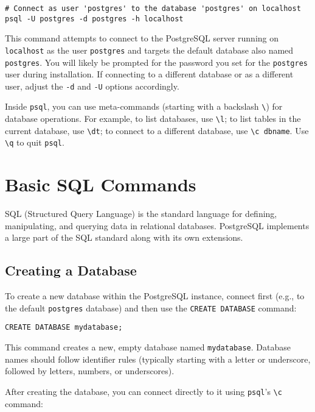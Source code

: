 \documentclass[12pt]{book}
\begin{document}
\begin{lstlisting}[style=bashstyle, caption={Connecting via psql}, label=lst:psql_connect]
# Connect as user 'postgres' to the database 'postgres' on localhost
psql -U postgres -d postgres -h localhost
\end{lstlisting}

This command attempts to connect to the PostgreSQL server running on \texttt{localhost} as the user \texttt{postgres} and targets the default database also named \texttt{postgres}. You will likely be prompted for the password you set for the \texttt{postgres} user during installation. If connecting to a different database or as a different user, adjust the \texttt{-d} and \texttt{-U} options accordingly.

Inside \texttt{psql}, you can use meta-commands (starting with a backslash \texttt{\textbackslash}) for database operations. For example, to list databases, use \verb|\l|; to list tables in the current database, use \verb|\dt|; to connect to a different database, use \verb|\c dbname|. Use \verb|\q| to quit \texttt{psql}.

\section{Basic SQL Commands}

SQL (Structured Query Language) is the standard language for defining, manipulating, and querying data in relational databases. PostgreSQL implements a large part of the SQL standard along with its own extensions.

\subsection{Creating a Database}

To create a new database within the PostgreSQL instance, connect first (e.g., to the default \texttt{postgres} database) and then use the \texttt{CREATE DATABASE} command:

\begin{lstlisting}[caption={Creating a Database}, label=lst:create_db]
CREATE DATABASE mydatabase;
\end{lstlisting}

This command creates a new, empty database named \texttt{mydatabase}. Database names should follow identifier rules (typically starting with a letter or underscore, followed by letters, numbers, or underscores).

After creating the database, you can connect directly to it using \texttt{psql}'s \verb|\c| command:
\end{document}
